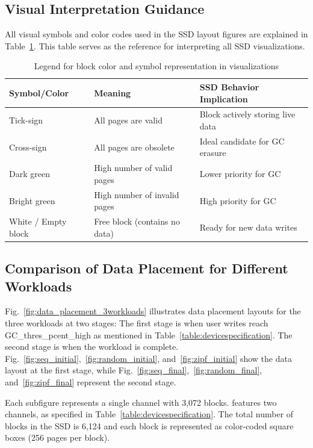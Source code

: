 \documentclass{ieeeaccess}
\begin{document}
\subsection{Visual Interpretation Guidance}
All visual symbols and color codes used in the SSD layout figures are explained in Table~\ref{table:visual_interpretation}. This table serves as the reference for interpreting all SSD visualizations.

\begin{table}
 \centering
 \caption{Legend for block color and symbol representation in visualizations}
 \label{table:visual_interpretation}
 \begin{tabular}{|p{1.6cm}|p{2.6cm}|p{3.1cm}|}
 \hline
 \textbf{Symbol/Color} & \textbf{Meaning} & \textbf{SSD Behavior Implication} \\
 \hline
 Tick-sign & All pages are valid & Block actively storing live data \\
 \hline
 Cross-sign & All pages are obsolete & Ideal candidate for GC erasure \\
 \hline
 Dark green & High number of valid pages & Lower priority for GC \\
 \hline
 Bright green & High number of invalid pages & High priority for GC \\
 \hline
 White / Empty block & Free block (contains no data) & Ready for new data writes \\
 \hline
 \end{tabular}
\end{table}

\subsection{Comparison of Data Placement for Different Workloads}
\label{subsec:ComparisonDataPlacement}
Fig.~\ref{fig:data_placement_3workloads} illustrates data placement layouts for the three workloads at two stages: The first stage is when user writes reach GC\_thres\_pcent\_high as mentioned in Table~\ref{table:devicespecification}. The second stage is when the workload is complete.
Fig.~\ref{fig:seq_initial},~\ref{fig:random_initial}, and~\ref{fig:zipf_initial} show the data layout at the first stage, while Fig.~\ref{fig:seq_final},~\ref{fig:random_final}, and~\ref{fig:zipf_final} represent the second stage.

Each subfigure represents a single channel with 3,072 blocks. \eyanassdsim features two channels, as specified in Table~\ref{table:devicespecification}. The total number of blocks in the SSD is 6,124 and each block is represented as color-coded square boxes (256 pages per block).
\end{document}
